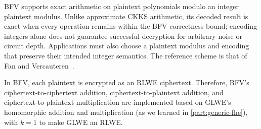 BFV supports exact arithmetic on plaintext polynomials modulo an integer plaintext modulus. Unlike approximate CKKS arithmetic, its decoded result is exact when every operation remains within the BFV correctness bound; encoding integers alone does not guarantee successful decryption for arbitrary noise or circuit depth. Applications must also choose a plaintext modulus and encoding that preserve their intended integer semantics. The reference scheme is that of Fan and Vercauteren~\cite{cryptoeprint:2012/144}.

In BFV, each plaintext is encrypted as an RLWE ciphertext. Therefore, BFV's ciphertext-to-ciphertext addition, ciphertext-to-plaintext addition, and ciphertext-to-plaintext multiplication are implemented based on GLWE's homomorphic addition and multiplication (as we learned in \autoref{part:generic-fhe}), with $k = 1$ to make GLWE an RLWE.




